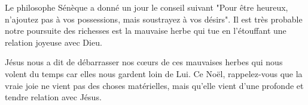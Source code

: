 Le philosophe Sénèque a donné un jour le conseil suivant "Pour être heureux, n'ajoutez pas à vos possessions, mais soustrayez à vos désirs". Il est très probable notre poursuite des richesses est la mauvaise herbe qui tue en l'étouffant une relation joyeuse avec Dieu.

\pagebreak
Jésus nous a dit de débarrasser nos cœurs de ces mauvaises herbes qui nous volent du temps car elles nous gardent loin de Lui. Ce Noël, rappelez-vous que la vraie joie ne vient pas des choses matérielles, mais qu'elle vient d'une profonde et tendre relation avec Jésus.




